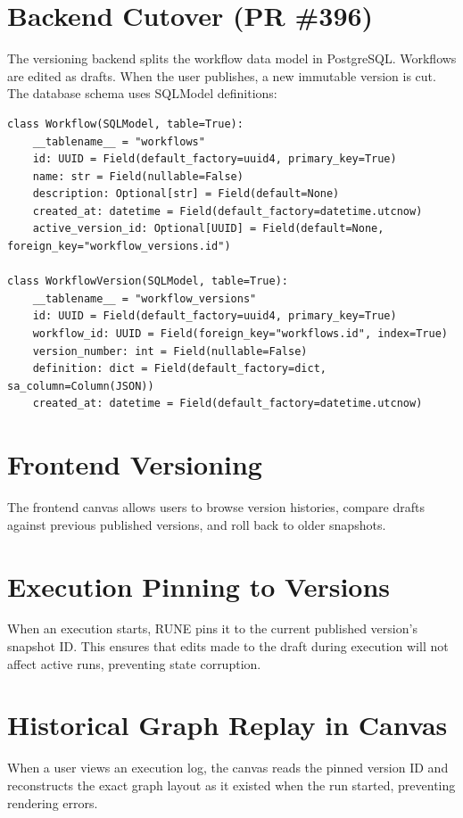 \documentclass[12pt]{report}
\begin{document}
\section{Backend Cutover (PR \#396)}
The versioning backend splits the workflow data model in PostgreSQL. Workflows are edited as drafts. When the user publishes, a new immutable version is cut.
The database schema uses SQLModel definitions:

\begin{lstlisting}[language={}, caption=SQLModel Schema representing Workflow and WorkflowVersion models]
class Workflow(SQLModel, table=True):
    __tablename__ = "workflows"
    id: UUID = Field(default_factory=uuid4, primary_key=True)
    name: str = Field(nullable=False)
    description: Optional[str] = Field(default=None)
    created_at: datetime = Field(default_factory=datetime.utcnow)
    active_version_id: Optional[UUID] = Field(default=None, foreign_key="workflow_versions.id")

class WorkflowVersion(SQLModel, table=True):
    __tablename__ = "workflow_versions"
    id: UUID = Field(default_factory=uuid4, primary_key=True)
    workflow_id: UUID = Field(foreign_key="workflows.id", index=True)
    version_number: int = Field(nullable=False)
    definition: dict = Field(default_factory=dict, sa_column=Column(JSON))
    created_at: datetime = Field(default_factory=datetime.utcnow)
\end{lstlisting}

\section{Frontend Versioning}
The frontend canvas allows users to browse version histories, compare drafts against previous published versions, and roll back to older snapshots.

\section{Execution Pinning to Versions}
When an execution starts, RUNE pins it to the current published version's snapshot ID. This ensures that edits made to the draft during execution will not affect active runs, preventing state corruption.

\section{Historical Graph Replay in Canvas}
When a user views an execution log, the canvas reads the pinned version ID and reconstructs the exact graph layout as it existed when the run started, preventing rendering errors.
\end{document}
